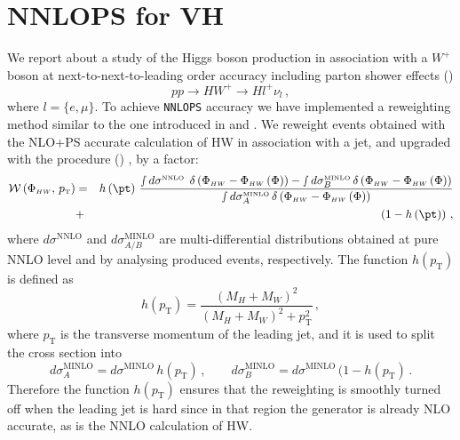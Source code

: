 \clearpage
\section{NNLOPS for VH}

We report about a study of the Higgs boson production in association with a $W^{+}$
boson at next-to-next-to-leading order accuracy including parton
shower effects (\NNLOPS{}) %
\begin{equation}
  pp\rightarrow HW^{+} \rightarrow H l^{+}\nu_{l}\,,
  \label{eq:def-process}
\end{equation}
where $l = \{e,\mu\}$.
To achieve \texttt{NNLOPS} accuracy we have implemented a reweighting
method similar to the one introduced in \HNNLOPS{}
\cite{Hamilton:2013fea} and \DYNNLOPS{} \cite{Karlberg:2014qua}. We
reweight events obtained with the \POWHEG{} NLO+PS accurate
calculation of HW in association with a jet, and upgraded with the
\MINLO{} procedure (\HWJMINLO{}) \cite{Luisoni:2013kna}, by a factor:
\begin{eqnarray} 
  \mathcal{W}\left(\PhiHWsimp,\, p_{{\scriptscriptstyle
      \mathrm{T}}}\right)&=&h\left(\pt\right)\,\frac{\smallint
    d\sigma^{{\scriptscriptstyle
        \mathrm{NNLO\phantom{i}}}}\,\delta\left(\PhiHWsimp-\PhiHWsimp\left(\Phi\right)\right)-\smallint
    d\sigma_{B}^{{\scriptscriptstyle
        \mathrm{MINLO}}}\,\delta\left(\PhiHWsimp-\PhiHWsimp\left(\Phi\right)\right)}{\smallint
    d\sigma_{A}^{{\scriptscriptstyle
        \mathrm{MINLO}}}\,\delta\left(\PhiHWsimp-\PhiHWsimp\left(\Phi\right)\right)}\nonumber\\ &+&\left(1-h\left(\pt\right)\right)\,,\label{eq:W}
\end{eqnarray}
where $d\sigma^{\mathrm{NNLO}}$ and $d\sigma_{A/B}^{\mathrm{MINLO}}$
are multi-differential distributions obtained at pure NNLO level and
by analysing produced \HWJMINLO{} events, respectively. The function
$h(p_{\scriptscriptstyle\mathrm{T}})$ is defined as
\begin{equation}
h(p_\mathrm{T}) = \frac{(M_{H}+M_W)^2}{(M_{H}+M_W)^2+p_\mathrm{T}^2}\,, \label{eq:h_pt}
\end{equation}
where $p_{\scriptscriptstyle\mathrm{T}}$ is the transverse momentum of
the leading jet, and it is used to split the \MINLO{} cross section
into
%
\begin{equation} d\sigma_A^{\scriptscriptstyle\mathrm{MINLO}} =d
\sigma^{\scriptscriptstyle\mathrm{MINLO}}\,
h(p_{\scriptscriptstyle\mathrm{T}})\,,\qquad
d\sigma_B^{\scriptscriptstyle\mathrm{MINLO}} =
d\sigma^{\scriptscriptstyle\mathrm{MINLO}}\,
(1-h(p_{\scriptscriptstyle\mathrm{T}})\,.
\end{equation}
Therefore the function $h(p_{\scriptscriptstyle\mathrm{T}})$ ensures that the
reweighting is smoothly turned off when the leading jet is hard since
in that region the \HWJMINLO{} generator is already NLO accurate, as
is the NNLO calculation of HW.

